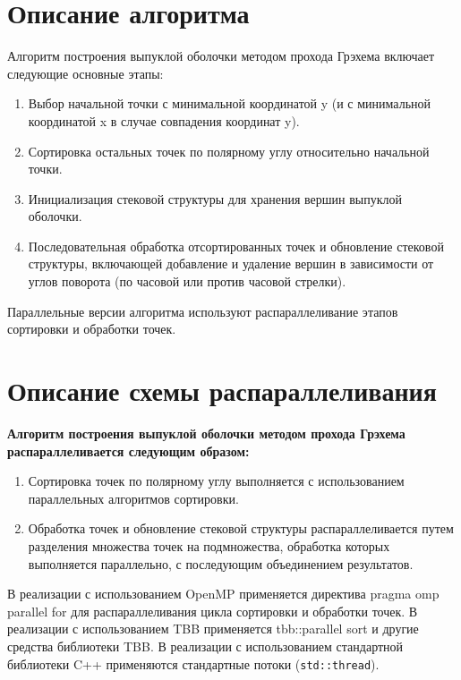 \documentclass{report}
\begin{document}
\section*{Описание алгоритма}
\par Алгоритм построения выпуклой оболочки методом прохода Грэхема включает следующие основные этапы:
\begin{enumerate}
\item Выбор начальной точки с минимальной координатой y (и с минимальной координатой x в случае совпадения координат y).
\item Сортировка остальных точек по полярному углу относительно начальной точки.
\item Инициализация стековой структуры для хранения вершин выпуклой оболочки.
\item Последовательная обработка отсортированных точек и обновление стековой структуры, включающей добавление и удаление вершин в зависимости от углов поворота (по часовой или против часовой стрелки).
\end{enumerate}

\par Параллельные версии алгоритма используют распараллеливание этапов сортировки и обработки точек.

\newpage

\section*{Описание схемы распараллеливания}
\par \textbf{Алгоритм построения выпуклой оболочки методом прохода Грэхема распараллеливается следующим образом:}
\begin{enumerate}
\item Сортировка точек по полярному углу выполняется с использованием параллельных алгоритмов сортировки.
\item Обработка точек и обновление стековой структуры распараллеливается путем разделения множества точек на подмножества, обработка которых выполняется параллельно, с последующим объединением результатов.
\end{enumerate}

\par В реализации с использованием OpenMP применяется директива pragma omp parallel for для распараллеливания цикла сортировки и обработки точек. В реализации с использованием TBB применяется tbb::parallel sort и другие средства библиотеки TBB. В реализации с использованием стандартной библиотеки C++ применяются стандартные потоки (\texttt{std::thread}).
\end{document}
